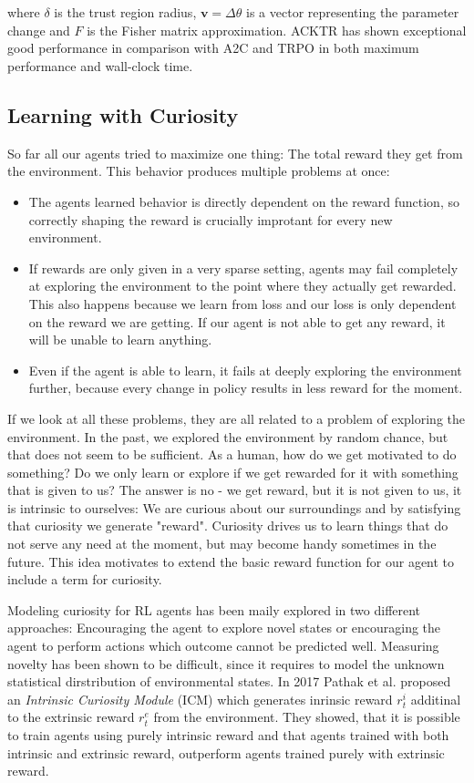 where $\delta$ is the trust region radius, $\mathbf{v} = \Delta\theta$ is a vector representing the parameter change and $\hat{F}$ is the Fisher matrix approximation.
ACKTR has shown exceptional good performance in comparison with A2C and TRPO in both maximum performance and wall-clock time.


\subsection{Learning with Curiosity} \label{ssec:Curiosity}
So far all our agents tried to maximize one thing: The total reward they get from the environment. This behavior produces multiple problems at once: 

\begin{itemize}
  \item The agents learned behavior is directly dependent on the reward function, so correctly shaping the reward is crucially improtant for every new environment.
  \item If rewards are only given in a very sparse setting, agents may fail completely at exploring the environment to the point where they actually get rewarded. This also happens because we learn from loss and our loss is only dependent on the reward we are getting. If our agent is not able to get any reward, it will be unable to learn anything.
  \item Even if the agent is able to learn, it fails at deeply exploring the environment further, because every change in policy results in less reward for the moment.
\end{itemize}

If we look at all these problems, they are all related to a problem of exploring the environment. In the past, we explored the environment by random chance, but that does not seem to be sufficient. As a human, how do we get motivated to do something? Do we only learn or explore if we get rewarded for it with something that is given to us? The answer is no - we get reward, but it is not given to us, it is intrinsic to ourselves: We are curious about our surroundings and by satisfying that curiosity we generate "reward". Curiosity drives us to learn things that do not serve any need at the moment, but may become handy sometimes in the future. This idea motivates to extend the basic reward function for our agent to include a term for curiosity.

Modeling curiosity for RL agents has been maily explored in two different approaches: Encouraging the agent to explore novel states  or encouraging the agent to perform actions which outcome cannot be predicted well. Measuring novelty has been shown to be difficult, since it requires to model the unknown statistical dirstribution of environmental states. In 2017 Pathak et al. proposed an \textit{Intrinsic Curiosity Module} (ICM) which generates inrinsic reward $r^i_t$ additinal to the extrinsic reward $r^e_t$ from the environment. They showed, that it is possible to train agents using purely intrinsic reward and that agents trained with both intrinsic and extrinsic reward, outperform agents trained purely with extrinsic reward.


